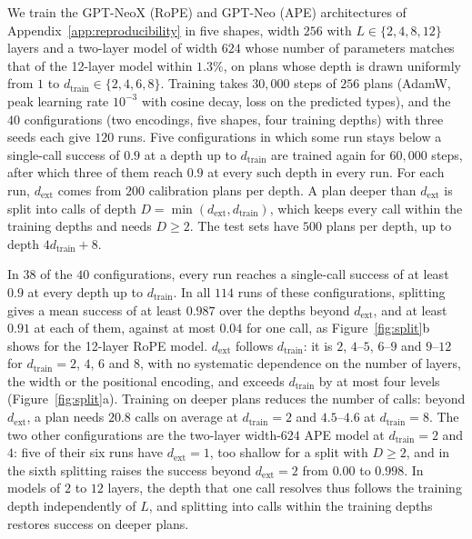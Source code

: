 We train the GPT-NeoX (RoPE) and GPT-Neo (APE) architectures of Appendix~\ref{app:reproducibility} in five shapes, width $256$ with $L\in\{2,4,8,12\}$ layers and a two-layer model of width $624$ whose number of parameters matches that of the 12-layer model within $1.3\%$, on plans whose depth is drawn uniformly from $1$ to $d_{\mathrm{train}}\in\{2,4,6,8\}$. Training takes $30{,}000$ steps of $256$ plans (AdamW, peak learning rate $10^{-3}$ with cosine decay, loss on the predicted types), and the $40$ configurations (two encodings, five shapes, four training depths) with three seeds each give $120$ runs. Five configurations in which some run stays below a single-call success of $0.9$ at a depth up to $d_{\mathrm{train}}$ are trained again for $60{,}000$ steps, after which three of them reach $0.9$ at every such depth in every run. For each run, $d_{\mathrm{ext}}$ comes from $200$ calibration plans per depth. A plan deeper than $d_{\mathrm{ext}}$ is split into calls of depth $D=\min(d_{\mathrm{ext}},d_{\mathrm{train}})$, which keeps every call within the training depths and needs $D\ge2$. The test sets have $500$ plans per depth, up to depth $4d_{\mathrm{train}}+8$.

In $38$ of the $40$ configurations, every run reaches a single-call success of at least $0.9$ at every depth up to $d_{\mathrm{train}}$. In all $114$ runs of these configurations, splitting gives a mean success of at least $0.987$ over the depths beyond $d_{\mathrm{ext}}$, and at least $0.91$ at each of them, against at most $0.04$ for one call, as Figure~\ref{fig:split}b shows for the 12-layer RoPE model. $d_{\mathrm{ext}}$ follows $d_{\mathrm{train}}$: it is $2$, $4$--$5$, $6$--$9$ and $9$--$12$ for $d_{\mathrm{train}}=2$, $4$, $6$ and $8$, with no systematic dependence on the number of layers, the width or the positional encoding, and exceeds $d_{\mathrm{train}}$ by at most four levels (Figure~\ref{fig:split}a). Training on deeper plans reduces the number of calls: beyond $d_{\mathrm{ext}}$, a plan needs $20.8$ calls on average at $d_{\mathrm{train}}=2$ and $4.5$--$4.6$ at $d_{\mathrm{train}}=8$. The two other configurations are the two-layer width-$624$ APE model at $d_{\mathrm{train}}=2$ and $4$: five of their six runs have $d_{\mathrm{ext}}=1$, too shallow for a split with $D\ge2$, and in the sixth splitting raises the success beyond $d_{\mathrm{ext}}=2$ from $0.00$ to $0.998$. In models of $2$ to $12$ layers, the depth that one call resolves thus follows the training depth independently of $L$, and splitting into calls within the training depths restores success on deeper plans.

